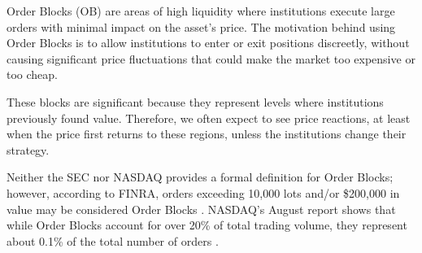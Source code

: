 
Order Blocks (OB) are areas of high liquidity where institutions execute large orders with minimal impact on the asset's price. The motivation behind using Order Blocks is to allow institutions to enter or exit positions discreetly, without causing significant price fluctuations that could make the market too expensive or too cheap.

These blocks are significant because they represent levels where institutions previously found value. Therefore, we often expect to see price reactions, at least when the price first returns to these regions, unless the institutions change their strategy.

Neither the SEC nor NASDAQ provides a formal definition for Order Blocks; however, according to FINRA, orders exceeding 10,000 lots and/or \$200,000 in value may be considered Order Blocks \cite{OB3}. NASDAQ's August report shows that while Order Blocks account for over 20\% of total trading volume, they represent about 0.1\% of the total number of orders \cite{OB4}.


